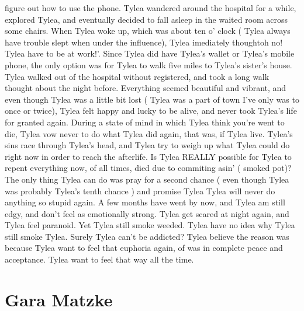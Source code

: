 \documentclass[12pt]{book}
\begin{document}
figure out how to use the phone. Tylea wandered around the hospital for a while, explored Tylea, and eventually decided to fall asleep in the waited room across some chairs. When Tylea woke up, which was about ten o' clock ( Tylea always have trouble slept when under the influence), Tylea imediately thoughtoh no! Tylea have to be at work!'. Since Tylea did have Tylea's wallet or Tylea's mobile phone, the only option was for Tylea to walk five miles to Tylea's sister's house. Tylea walked out of the hospital without registered, and took a long walk thought about the night before. Everything seemed beautiful and vibrant, and even though Tylea was a little bit lost ( Tylea was a part of town I've only was to once or twice), Tylea felt happy and lucky to be alive, and never took Tylea's life for granted again. During a state of mind in which Tylea think you're went to die, Tylea vow never to do what Tylea did again, that was, if Tylea live. Tylea's sins race through Tylea's head, and Tylea try to weigh up what Tylea could do right now in order to reach the afterlife. Is Tylea REALLY possible for Tylea to repent everything now, of all times, died due to commiting asin' ( smoked pot)? The only thing Tylea can do was pray for a second chance ( even though Tylea was probably Tylea's tenth chance ) and promise Tylea Tylea will never do anything so stupid again. A few months have went by now, and Tylea am still edgy, and don't feel as emotionally strong. Tylea get scared at night again, and Tylea feel paranoid. Yet Tylea still smoke weeded. Tylea have no idea why Tylea still smoke Tylea. Surely Tylea can't be addicted? Tylea believe the reason was because Tylea want to feel that euphoria again, of was in complete peace and acceptance. Tylea want to feel that way all the time.



\chapter{Gara Matzke}
\end{document}
